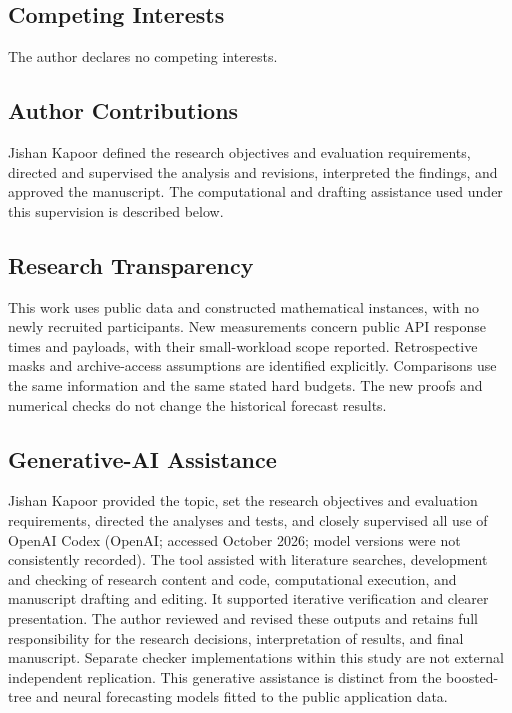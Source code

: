 \documentclass[12pt]{article}
\begin{document}
\subsection*{Competing Interests}
The author declares no competing interests.

\subsection*{Author Contributions}
Jishan Kapoor defined the research objectives and evaluation requirements,
directed and supervised the analysis and revisions, interpreted the findings,
and approved the manuscript. The computational and drafting assistance used
under this supervision is described below.

\subsection*{Research Transparency}
This work uses public data and constructed mathematical instances, with
no newly recruited participants. New measurements concern public API
response times and payloads, with their small-workload scope reported. Retrospective masks and
archive-access assumptions are identified explicitly. Comparisons use
the same information and the same stated hard budgets. The new proofs
and numerical checks do not change the historical forecast results.

\subsection*{Generative-AI Assistance}
Jishan Kapoor provided the topic, set the research objectives and evaluation
requirements, directed the analyses and tests, and closely supervised all
use of OpenAI Codex (OpenAI; accessed October 2026; model versions were not
consistently recorded). The tool assisted with literature searches,
development and checking of research content and code, computational
execution, and manuscript drafting and editing. It supported iterative
verification and clearer presentation. The author reviewed and revised
these outputs and retains full responsibility for the research decisions,
interpretation of results, and final manuscript. Separate checker
implementations within this study are not external independent replication.
This generative assistance is distinct from the boosted-tree and neural
forecasting models fitted to the public application data.
\end{document}
